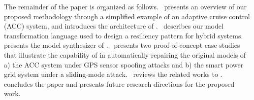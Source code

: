 The remainder of the paper is organized as follows.~ presents an overview of our proposed methodology through a simplified example of an adaptive cruise control (ACC) system, and introduces the architecture of \toolreaffirm.~ describes our model transformation language used to design a resiliency pattern for hybrid systems.~ presents the model synthesizer of \toolreaffirm.~ presents two proof-of-concept case studies that illustrate the capability of \toolreaffirm in automatically repairing the original models of a) the ACC system under GPS sensor spoofing attacks and b) the smart power grid system under a sliding-mode attack.~ reviews the related works to \toolreaffirm.~ concludes the paper and presents future research directions for the proposed work.





